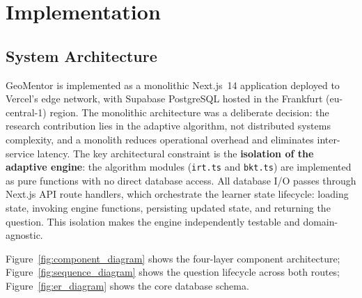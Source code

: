 \chapter{Implementation}
\label{ch:implementation}

\section{System Architecture}
\label{sec:impl_architecture}

GeoMentor is implemented as a monolithic Next.js~14 application deployed to
Vercel's edge network, with Supabase PostgreSQL hosted in the Frankfurt
(eu-central-1) region. The monolithic architecture was a deliberate decision:
the research contribution lies in the adaptive algorithm, not distributed
systems complexity, and a monolith reduces operational overhead and eliminates
inter-service latency. The key architectural constraint is the \textbf{isolation
of the adaptive engine}: the algorithm modules (\texttt{irt.ts} and
\texttt{bkt.ts}) are implemented as pure functions with no direct database
access. All database I/O passes through Next.js API route handlers, which
orchestrate the learner state lifecycle: loading state, invoking engine
functions, persisting updated state, and returning the question. This isolation
makes the engine independently testable and domain-agnostic.

Figure~\ref{fig:component_diagram} shows the four-layer component architecture;
Figure~\ref{fig:sequence_diagram} shows the question lifecycle across both
routes; Figure~\ref{fig:er_diagram} shows the core database schema.

